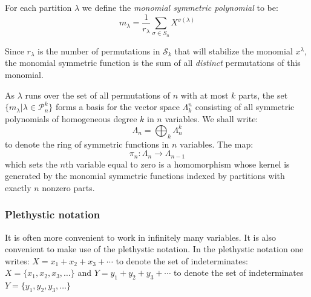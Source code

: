 \documentclass[12pt,dvips]{amsart}
\begin{document}
For each partition $\lambda$ we define the {\it monomial symmetric polynomial} to be:
$$ m_\lambda = \frac{1}{r_\lambda} \sum_{\sigma \in S_n} X^{\sigma(\lambda)} $$

Since $r_\lambda$ is the number of permutations in $\mathcal{S}_k$ that will stabilize the monomial
$x^\lambda$, the monomial symmetric
function is the sum of all {\it distinct} permutations of this monomial.


As $\lambda$ runs over the set of all permutations of $n$ with at most $k$ parts, the set $\{m_{\lambda} | \lambda \in \mathcal{P}^k_n \}$ forms a basis for the vector space $\Lambda_k^n$ consisting of all symmetric polynomials of homogeneous degree $k$ in $n$ variables. We shall write:
$$ \Lambda_n = \bigoplus_{k} \Lambda_n^k$$
to denote the ring of symmetric functions in $n$ variables. 
The map:
$$ \pi_n : \Lambda_{n} \to \Lambda_{n-1}$$
which sets the $n$th variable equal to zero is a homomorphism whose kernel is generated by the monomial symmetric functions indexed by partitions with exactly $n$ nonzero parts. 

\subsubsection{Plethystic notation}\label{pleth}
It is often more convenient to work in infinitely many variables. It is also convenient to make use of the plethystic notation. In the plethystic notation one writes:
$ X = x_1 + x_2 + x_3 + \cdots $
to denote the set of indeterminates:
$ X = \{ x_1, x_2, x_3, \ldots \}$
and $ Y = y_1 + y_2 + y_3 + \cdots$
to denote the set of indeterminates
$ Y = \{ y_1, y_2, y_3, \ldots \}$
\end{document}

